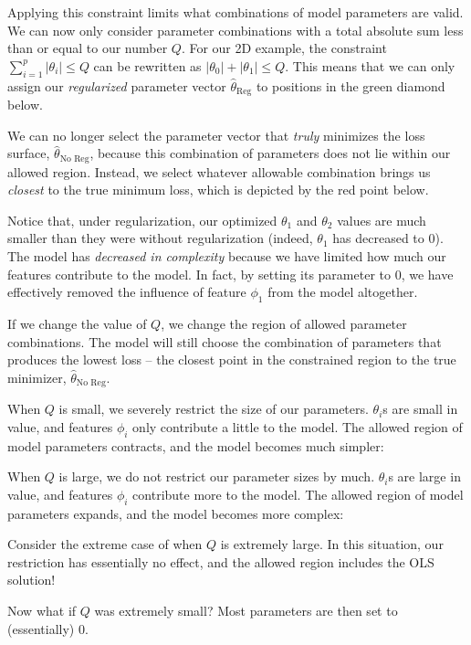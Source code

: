 \documentclass[
  letterpaper,
  DIV=11,
  numbers=noendperiod]{scrreprt}
\begin{document}
Applying this constraint limits what combinations of model parameters
are valid. We can now only consider parameter combinations with a total
absolute sum less than or equal to our number \(Q\). For our 2D example,
the constraint \(\sum_{i=1}^p |\theta_i| \leq Q\) can be rewritten as
\(|\theta_0| + |\theta_1| \leq Q\). This means that we can only assign
our \emph{regularized} parameter vector \(\hat{\theta}_{\text{Reg}}\) to
positions in the green diamond below.

We can no longer select the parameter vector that \emph{truly} minimizes
the loss surface, \(\hat{\theta}_{\text{No Reg}}\), because this
combination of parameters does not lie within our allowed region.
Instead, we select whatever allowable combination brings us
\emph{closest} to the true minimum loss, which is depicted by the red
point below.

Notice that, under regularization, our optimized \(\theta_1\) and
\(\theta_2\) values are much smaller than they were without
regularization (indeed, \(\theta_1\) has decreased to 0). The model has
\emph{decreased in complexity} because we have limited how much our
features contribute to the model. In fact, by setting its parameter to
0, we have effectively removed the influence of feature \(\phi_1\) from
the model altogether.

If we change the value of \(Q\), we change the region of allowed
parameter combinations. The model will still choose the combination of
parameters that produces the lowest loss -- the closest point in the
constrained region to the true minimizer,
\(\hat{\theta}_{\text{No Reg}}\).

When \(Q\) is small, we severely restrict the size of our parameters.
\(\theta_i\)s are small in value, and features \(\phi_i\) only
contribute a little to the model. The allowed region of model parameters
contracts, and the model becomes much simpler:

When \(Q\) is large, we do not restrict our parameter sizes by much.
\(\theta_i\)s are large in value, and features \(\phi_i\) contribute
more to the model. The allowed region of model parameters expands, and
the model becomes more complex:

Consider the extreme case of when \(Q\) is extremely large. In this
situation, our restriction has essentially no effect, and the allowed
region includes the OLS solution!

Now what if \(Q\) was extremely small? Most parameters are then set to
(essentially) 0.
\end{document}
